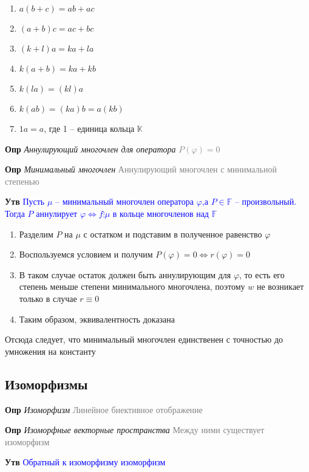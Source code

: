 \begin{enumerate}
    \item $a(b + c) = ab + ac$
    \item $(a + b)c = ac + bc$
    \item $(k+l)a = ka + la$
    \item $k(a + b) = ka + kb$
    \item $k(la) = (kl)a$
    \item $k(ab) = (ka)b = a(kb)$
    \item $1a = a$, где 1 -- единица кольца $\mathbb{K}$
\end{enumerate}

\textbf{Опр} \textit{Аннулирующий многочлен для оператора} \textcolor{gray}{$P(\varphi) = 0$}

\textbf{Опр} \textit{Минимальный многочлен} \textcolor{gray}{Аннулирующий многочлен с минимальной степенью}

\textbf{Утв} \textcolor{blue}{Пусть $\mu$ -- минимальный многочлен оператора $\varphi$,а $P \in \mathbb{F}$ --
произвольный.
Тогда $P$ аннулирует $\varphi \Leftrightarrow f \vdots \mu$ в кольце многочленов над $\mathbb{F}$}

\begin{enumerate}
    \item Разделим $P$ на $\mu$ с остатком и подставим в полученное равенство $\varphi$
    \item Воспользуемся условием и получим $P(\varphi) = 0 \Leftrightarrow r(\varphi) = 0$
    \item В таком случае остаток должен быть аннулирующим для $\varphi$, то есть его степень меньше степени
    минимального многочлена, поэтому $w$ не возникает только в случае $r \equiv 0$
    \item Таким образом, эквивалентность доказана
\end{enumerate}

Отсюда следует, что минимальный многочлен единственен с точностью до умножения на константу

\subsection{Изоморфизмы}

\textbf{Опр} \textit{Изоморфизм} \textcolor{gray}{Линейное биективное отображение}

\textbf{Опр} \textit{Изоморфные векторные пространства} \textcolor{gray}{Между ними существует изоморфизм}

\textbf{Утв} \textcolor{blue}{Обратный к изоморфизму изоморфизм}

